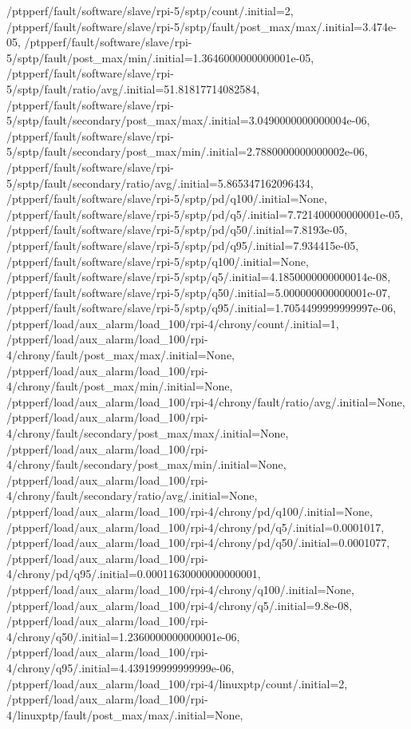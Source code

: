 {    /ptpperf/fault/software/slave/rpi-5/sptp/count/.initial=2,
    /ptpperf/fault/software/slave/rpi-5/sptp/fault/post_max/max/.initial=3.474e-05,
    /ptpperf/fault/software/slave/rpi-5/sptp/fault/post_max/min/.initial=1.3646000000000001e-05,
    /ptpperf/fault/software/slave/rpi-5/sptp/fault/ratio/avg/.initial=51.81817714082584,
    /ptpperf/fault/software/slave/rpi-5/sptp/fault/secondary/post_max/max/.initial=3.0490000000000004e-06,
    /ptpperf/fault/software/slave/rpi-5/sptp/fault/secondary/post_max/min/.initial=2.7880000000000002e-06,
    /ptpperf/fault/software/slave/rpi-5/sptp/fault/secondary/ratio/avg/.initial=5.865347162096434,
    /ptpperf/fault/software/slave/rpi-5/sptp/pd/q100/.initial=None,
    /ptpperf/fault/software/slave/rpi-5/sptp/pd/q5/.initial=7.721400000000001e-05,
    /ptpperf/fault/software/slave/rpi-5/sptp/pd/q50/.initial=7.8193e-05,
    /ptpperf/fault/software/slave/rpi-5/sptp/pd/q95/.initial=7.934415e-05,
    /ptpperf/fault/software/slave/rpi-5/sptp/q100/.initial=None,
    /ptpperf/fault/software/slave/rpi-5/sptp/q5/.initial=4.1850000000000014e-08,
    /ptpperf/fault/software/slave/rpi-5/sptp/q50/.initial=5.000000000000001e-07,
    /ptpperf/fault/software/slave/rpi-5/sptp/q95/.initial=1.7054499999999997e-06,
    /ptpperf/load/aux_alarm/load_100/rpi-4/chrony/count/.initial=1,
    /ptpperf/load/aux_alarm/load_100/rpi-4/chrony/fault/post_max/max/.initial=None,
    /ptpperf/load/aux_alarm/load_100/rpi-4/chrony/fault/post_max/min/.initial=None,
    /ptpperf/load/aux_alarm/load_100/rpi-4/chrony/fault/ratio/avg/.initial=None,
    /ptpperf/load/aux_alarm/load_100/rpi-4/chrony/fault/secondary/post_max/max/.initial=None,
    /ptpperf/load/aux_alarm/load_100/rpi-4/chrony/fault/secondary/post_max/min/.initial=None,
    /ptpperf/load/aux_alarm/load_100/rpi-4/chrony/fault/secondary/ratio/avg/.initial=None,
    /ptpperf/load/aux_alarm/load_100/rpi-4/chrony/pd/q100/.initial=None,
    /ptpperf/load/aux_alarm/load_100/rpi-4/chrony/pd/q5/.initial=0.0001017,
    /ptpperf/load/aux_alarm/load_100/rpi-4/chrony/pd/q50/.initial=0.0001077,
    /ptpperf/load/aux_alarm/load_100/rpi-4/chrony/pd/q95/.initial=0.00011630000000000001,
    /ptpperf/load/aux_alarm/load_100/rpi-4/chrony/q100/.initial=None,
    /ptpperf/load/aux_alarm/load_100/rpi-4/chrony/q5/.initial=9.8e-08,
    /ptpperf/load/aux_alarm/load_100/rpi-4/chrony/q50/.initial=1.2360000000000001e-06,
    /ptpperf/load/aux_alarm/load_100/rpi-4/chrony/q95/.initial=4.439199999999999e-06,
    /ptpperf/load/aux_alarm/load_100/rpi-4/linuxptp/count/.initial=2,
    /ptpperf/load/aux_alarm/load_100/rpi-4/linuxptp/fault/post_max/max/.initial=None,
}
